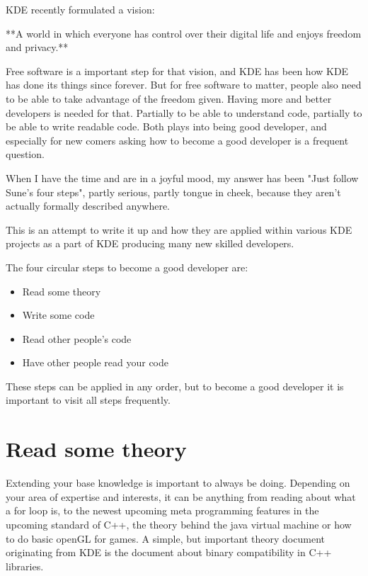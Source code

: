 


\noindent{}
KDE recently formulated a vision:

**A world in which everyone has control over their digital life and enjoys freedom and privacy.**

Free software is a important step for that vision, and KDE has been how KDE has done its things since forever. But for free software to matter, people also need to be able to take advantage of the freedom given. Having more and better developers is needed for that. Partially to be able to understand code, partially to be able to write readable code. Both plays into being good developer, and especially for new comers asking how to become a good developer is a frequent question.

When I have the time and are in a joyful mood, my answer has been "Just follow Sune's four steps", partly serious, partly tongue in cheek, because they aren't actually formally described anywhere.

This is an attempt to write it up and how they are applied within various KDE projects as a part of KDE producing many new skilled developers.

The four circular steps to become a good developer are:
\begin{itemize}
 \item Read some theory
 \item Write some code
 \item Read other people's code
 \item Have other people read your code
\end{itemize}

These steps can be applied in any order, but to become a good developer it is important to visit all steps frequently.

\section*{Read some theory}
Extending your base knowledge is important to always be doing. Depending on your area of expertise and interests, it can be anything from reading about what a for loop is, to the newest upcoming meta programming features in the upcoming standard of C++, the theory behind the java virtual machine or how to do basic openGL for games. A simple, but important theory document originating from KDE is the document about binary compatibility in C++ libraries.

